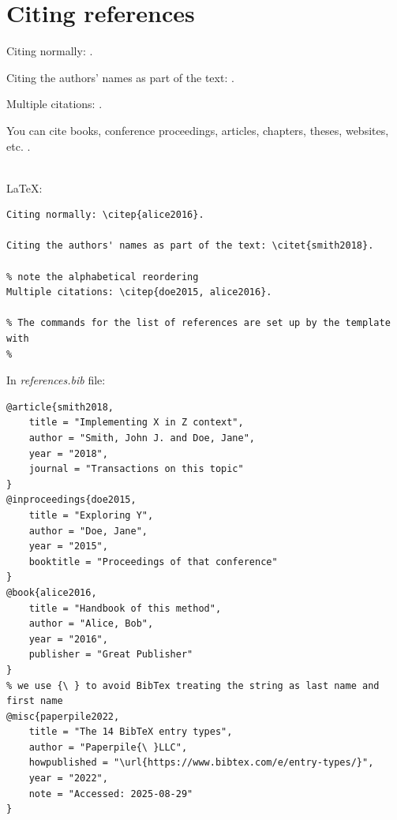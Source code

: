 \documentclass[12pt,nonacm,acmlarge,titlepage,screen]{acmart}
\begin{document}
\section*{Citing references}

Citing normally: \citep{alice2016}.

Citing the authors' names as part of the text: \citet{smith2018}.

Multiple citations: \citep{doe2015, alice2016}.

You can cite books, conference proceedings, articles, chapters, theses, websites, etc. \citep{paperpile2022}.

\noindent\begin{minipage}[t]{\textwidth}
\renewcommand{\bibname}{References}
% 
% 

% 

\end{minipage}\\

\noindent\LaTeX:
\begin{Verbatim}[frame=single]
Citing normally: \citep{alice2016}.

Citing the authors' names as part of the text: \citet{smith2018}.

% note the alphabetical reordering
Multiple citations: \citep{doe2015, alice2016}.

% The commands for the list of references are set up by the template with 
% 
\end{Verbatim}

\noindent In \textit{references.bib} file:
\begin{Verbatim}[frame=single]
@article{smith2018,
    title = "Implementing X in Z context",
    author = "Smith, John J. and Doe, Jane",
    year = "2018",
    journal = "Transactions on this topic"
}
@inproceedings{doe2015,
    title = "Exploring Y",
    author = "Doe, Jane",
    year = "2015",
    booktitle = "Proceedings of that conference"
}
@book{alice2016,
    title = "Handbook of this method",
    author = "Alice, Bob",
    year = "2016",
    publisher = "Great Publisher"
}
% we use {\ } to avoid BibTex treating the string as last name and first name
@misc{paperpile2022,
    title = "The 14 BibTeX entry types",
    author = "Paperpile{\ }LLC",
    howpublished = "\url{https://www.bibtex.com/e/entry-types/}",
    year = "2022",
    note = "Accessed: 2025-08-29"
}
\end{Verbatim}
\end{document}
